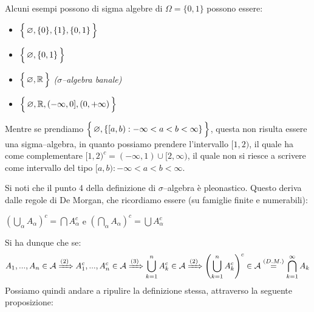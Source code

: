 \begin{esempio}
    Alcuni esempi possono di sigma algebre di $\Omega = \{0, 1\}$ possono essere:
    \begin{itemize}
        \item $\Bigl\{\,\varnothing, \{0\}, \{1\}, \{0, 1\}\,\Bigr\}$
        \item $\Bigl\{\,\varnothing, \{0, 1\}\,\Bigr\}$
        \item $\Bigl\{\,\varnothing, \mathbb{R}\,\Bigr\}$ \hfill \textit{($\sigma$--algebra banale)}
        \item $\Bigl\{\,\varnothing, \mathbb{R}, (-\infty, 0], (0, +\infty)\,\Bigr\}$
    \end{itemize}
Mentre se prendiamo $\Bigl\{\, \varnothing, \{[a, b): -\infty < a < b < \infty\}\,\Bigr\}$, questa non risulta essere una sigma--algebra, in quanto possiamo prendere l'intervallo $[1, 2)$, il quale ha come complementare $[1, 2)^c = (-\infty, 1) \cup [2, \infty)$, il quale non si riesce a scrivere come intervallo del tipo $[a, b): -\infty < a < b < \infty$.
\end{esempio}
Si noti che il punto 4 della definizione di $\sigma$--algebra è pleonastico. Questo deriva dalle regole di De Morgan, che ricordiamo essere (su famiglie finite e numerabili):

\begin{center}
$\left( \bigcup_\alpha A_\alpha \right)^c = \bigcap A_\alpha^c$ 
\quad \quad e \quad \quad
$\left( \bigcap_\alpha A_\alpha \right)^c = \bigcup A_\alpha^c$
\end{center}
Si ha dunque che se: \\
\[A_1 ,..., A_n \in \mathcal{A} \xRightarrow{(2)} A_1^c ,..., A_n^c \in \mathcal{A}\xRightarrow{(3)} \bigcup_{k=1}^n A_k^c \in \mathcal{A} \xRightarrow{(2)} \left(\bigcup_{k=1}^n A_k^c \right)^c \in \mathcal{A} \overset{(D.M.)}{=} \bigcap_{k=1}^\infty A_k\]
Possiamo quindi andare a ripulire la definizione stessa, attraverso la seguente proposizione:

